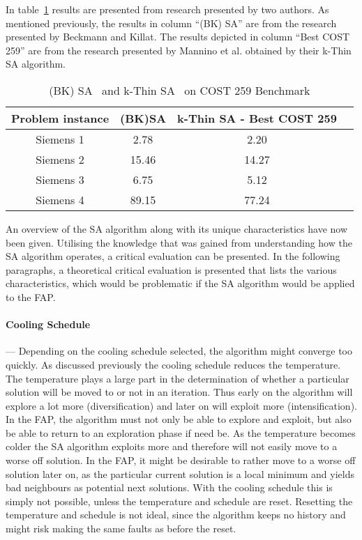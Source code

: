 In table~\ref{tab:SA} results are presented from research presented by two authors. As mentioned previously, the results in column ``(BK) \gls{SA}'' are from the research presented by Beckmann and Killat\cite{BeKi99a}. The results depicted in column ``Best \gls{COST} 259'' are from the research presented by Mannino et al.\cite{MaOrRi02} obtained by their k-Thin \gls{SA} algorithm.
\begin{table}[H]
\centering
	\begin{tabular}{| c | c | c | c |}
	\hline
    Problem instance & (BK)\gls{SA} & k-Thin SA - Best \gls{COST} 259 \\ \hline
	Siemens 1 & 2.78 & 2.20\\ \hline
	Siemens 2 & 15.46 & 14.27\\ \hline
	Siemens 3 & 6.75 & 5.12\\ \hline
	Siemens 4 & 89.15 & 77.24\\ \hline
	\end{tabular}
    \caption{(BK) SA~\cite{BeKi99a} and k-Thin SA~\cite{MaOrRi02} on \gls{COST} 259 Benchmark}
\label{tab:SA}
\end{table}


An overview of the \gls{SA} algorithm along with its unique characteristics have now been given. Utilising the knowledge that was gained from understanding how the \gls{SA} algorithm operates, a critical evaluation can be presented. In the following paragraphs, a theoretical critical evaluation is presented that lists the various characteristics, which would be problematic if the \gls{SA} algorithm would be applied to the \gls{FAP}.

\paragraph{Cooling Schedule}
--- Depending on the cooling schedule selected, the algorithm might converge too quickly. As discussed previously the cooling schedule reduces the temperature. The temperature plays a large part in the determination of whether a particular solution will be moved to or not in an iteration. Thus early on the algorithm will explore a lot more (diversification) and later on will exploit more (intensification). In the \gls{FAP}, the algorithm must not only be able to explore and exploit, but also be able to return to an exploration phase if need be.
As the temperature becomes colder the \gls{SA} algorithm exploits more and therefore will not easily move to a worse off solution. In the \gls{FAP}, it might be desirable to rather move to a worse off solution later on, as the particular current solution is a local minimum and yields bad neighbours as potential next solutions. With the cooling schedule this is simply not possible, unless the temperature and schedule are reset. Resetting the temperature and schedule is not ideal, since the algorithm keeps no history and might risk making the same faults as before the reset.
